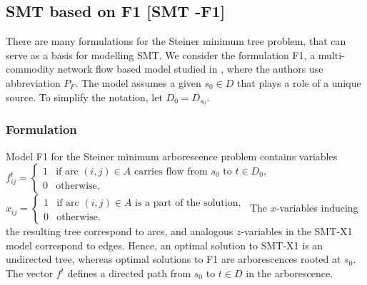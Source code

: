 \subsection{SMT based on F1 [SMT -F1]}

There are many formulations for the Steiner minimum tree problem, that can serve as a basis for modelling SMT. We consider the formulation F1, a multi-commodity network flow based model studied in \cite{Polzin}, where the authors use abbreviation $P_{F}$. The model assumes a given $s_0\in D$ that plays a role of a unique source.  To simplify the notation, let $D_0= D_{s_0}$.
\subsubsection{Formulation}
Model F1 for the Steiner minimum arborescence problem contains variables
\newline\newline  
  $f^{t}_{ij}=
	\begin{cases}
    1 & \text{if arc $(i,j) \in A$ carries flow from $s_0$ to $t\in D_0$},\\
    0 & \text{otherwise},
  \end{cases}$  
\newline\newline  
  $x_{ij}=
	\begin{cases}
    1 & \text{if arc $(i,j) \in A$ is a part of the solution},\\
    0 & \text{otherwise}.
  \end{cases}$  
\newline
\newline   
The $x$-variables inducing the resulting tree correspond to arcs, and analogous $z$-variables in the SMT-X1 model correspond to edges. Hence, an optimal solution to SMT-X1 is an undirected tree, whereas optimal solutions to F1 are arborescences rooted at $s_0$. The vector $f^t$ defines a directed path from $s_0$ to $t\in D$ in the arborescence.

